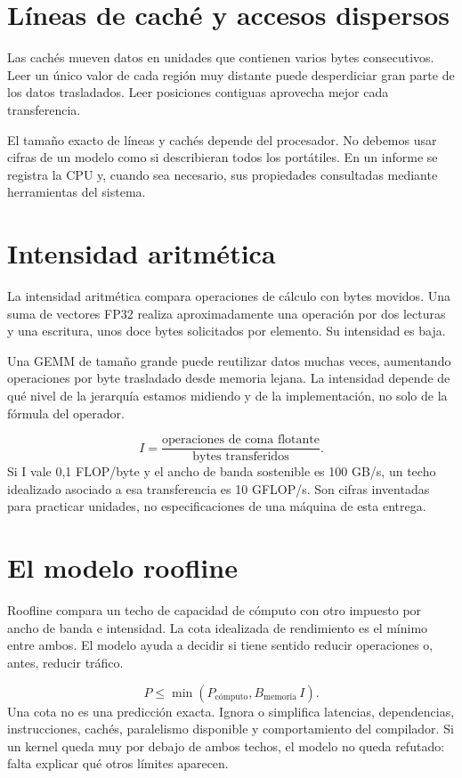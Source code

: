 \documentclass[12pt,a4paper,oneside]{report}
\begin{document}
\section{Líneas de caché y accesos dispersos}
Las cachés mueven datos en unidades que contienen varios bytes consecutivos. Leer un único valor de cada región muy distante puede desperdiciar gran parte de los datos trasladados. Leer posiciones contiguas aprovecha mejor cada transferencia.

El tamaño exacto de líneas y cachés depende del procesador. No debemos usar cifras de un modelo como si describieran todos los portátiles. En un informe se registra la CPU y, cuando sea necesario, sus propiedades consultadas mediante herramientas del sistema.

\section{Intensidad aritmética}
La intensidad aritmética compara operaciones de cálculo con bytes movidos. Una suma de vectores FP32 realiza aproximadamente una operación por dos lecturas y una escritura, unos doce bytes solicitados por elemento. Su intensidad es baja.

Una GEMM de tamaño grande puede reutilizar datos muchas veces, aumentando operaciones por byte trasladado desde memoria lejana. La intensidad depende de qué nivel de la jerarquía estamos midiendo y de la implementación, no solo de la fórmula del operador.

\begin{traduccion}
\[
I=\frac{\text{operaciones de coma flotante}}{\text{bytes transferidos}}.
\]
Si I vale 0,1 FLOP/byte y el ancho de banda sostenible es 100 GB/s, un techo idealizado asociado a esa transferencia es 10 GFLOP/s. Son cifras inventadas para practicar unidades, no especificaciones de una máquina de esta entrega.

\end{traduccion}
\section{El modelo roofline}
Roofline compara un techo de capacidad de cómputo con otro impuesto por ancho de banda e intensidad. La cota idealizada de rendimiento es el mínimo entre ambos. El modelo ayuda a decidir si tiene sentido reducir operaciones o, antes, reducir tráfico. \cite{roofline}

\[
P\leq \min(P_{\text{cómputo}}, B_{\text{memoria}}\,I).
\]
Una cota no es una predicción exacta. Ignora o simplifica latencias, dependencias, instrucciones, cachés, paralelismo disponible y comportamiento del compilador. Si un kernel queda muy por debajo de ambos techos, el modelo no queda refutado: falta explicar qué otros límites aparecen.
\end{document}
